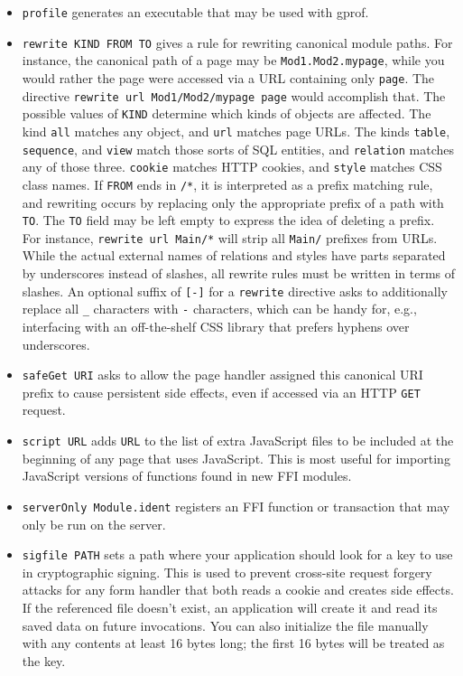 \documentclass{article}
\newcommand{\cd}[1]{\texttt{#1}}
\begin{document}
\begin{itemize}
\item \texttt{profile} generates an executable that may be used with gprof.
\item \texttt{rewrite KIND FROM TO} gives a rule for rewriting canonical module paths.  For instance, the canonical path of a page may be \texttt{Mod1.Mod2.mypage}, while you would rather the page were accessed via a URL containing only \texttt{page}.  The directive \texttt{rewrite url Mod1/Mod2/mypage page} would accomplish that.  The possible values of \texttt{KIND} determine which kinds of objects are affected.  The kind \texttt{all} matches any object, and \texttt{url} matches page URLs.  The kinds \texttt{table}, \texttt{sequence}, and \texttt{view} match those sorts of SQL entities, and \texttt{relation} matches any of those three.  \texttt{cookie} matches HTTP cookies, and \texttt{style} matches CSS class names.  If \texttt{FROM} ends in \texttt{/*}, it is interpreted as a prefix matching rule, and rewriting occurs by replacing only the appropriate prefix of a path with \texttt{TO}.  The \texttt{TO} field may be left empty to express the idea of deleting a prefix.  For instance, \texttt{rewrite url Main/*} will strip all \texttt{Main/} prefixes from URLs.  While the actual external names of relations and styles have parts separated by underscores instead of slashes, all rewrite rules must be written in terms of slashes.  An optional suffix of \cd{[-]} for a \cd{rewrite} directive asks to additionally replace all \cd{\_} characters with \cd{-} characters, which can be handy for, e.g., interfacing with an off-the-shelf CSS library that prefers hyphens over underscores.
\item \texttt{safeGet URI} asks to allow the page handler assigned this canonical URI prefix to cause persistent side effects, even if accessed via an HTTP \cd{GET} request.
\item \texttt{script URL} adds \texttt{URL} to the list of extra JavaScript files to be included at the beginning of any page that uses JavaScript.  This is most useful for importing JavaScript versions of functions found in new FFI modules.
\item \texttt{serverOnly Module.ident} registers an FFI function or transaction that may only be run on the server.
\item \texttt{sigfile PATH} sets a path where your application should look for a key to use in cryptographic signing.  This is used to prevent cross-site request forgery attacks for any form handler that both reads a cookie and creates side effects.  If the referenced file doesn't exist, an application will create it and read its saved data on future invocations.  You can also initialize the file manually with any contents at least 16 bytes long; the first 16 bytes will be treated as the key.

\end{itemize}
\end{document}
